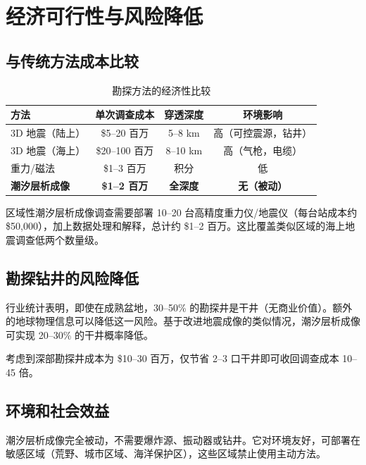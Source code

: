 \documentclass[12pt,a4paper]{article}
\theoremstyle{remark}
\begin{document}
	\section{经济可行性与风险降低}
	\label{sec:economics}
	
	\subsection{与传统方法成本比较}
	
	\begin{table}[htbp]
		\centering
		\caption{勘探方法的经济性比较}
		\label{tab:economics}
		\small
		\begin{tabular}{lccc}
			\toprule
			\textbf{方法} & \textbf{单次调查成本} & \textbf{穿透深度} & \textbf{环境影响} \\
			\midrule
			3D 地震（陆上） & \$5–20 百万 & 5–8 km & 高（可控震源，钻井） \\
			3D 地震（海上） & \$20–100 百万 & 8–10 km & 高（气枪，电缆） \\
			重力/磁法 & \$1–3 百万 & 积分 & 低 \\
			\textbf{潮汐层析成像} & \textbf{\$1–2 百万} & \textbf{全深度} & \textbf{无（被动）} \\
			\bottomrule
		\end{tabular}
	\end{table}
	
	区域性潮汐层析成像调查需要部署 10–20 台高精度重力仪/地震仪（每台站成本约 \$50,000），加上数据处理和解释，总计约 \$1–2 百万。这比覆盖类似区域的海上地震调查低两个数量级。
	
	\subsection{勘探钻井的风险降低}
	
	行业统计表明，即使在成熟盆地，30–50\% 的勘探井是干井（无商业价值）。额外的地球物理信息可以降低这一风险。基于改进地震成像的类似情况，潮汐层析成像可实现 20–30\% 的干井概率降低。
	
	考虑到深部勘探井成本为 \$10–30 百万，仅节省 2–3 口干井即可收回调查成本 10–45 倍。
	
	\subsection{环境和社会效益}
	
	潮汐层析成像完全被动，不需要爆炸源、振动器或钻井。它对环境友好，可部署在敏感区域（荒野、城市区域、海洋保护区），这些区域禁止使用主动方法。
	
\end{document}
